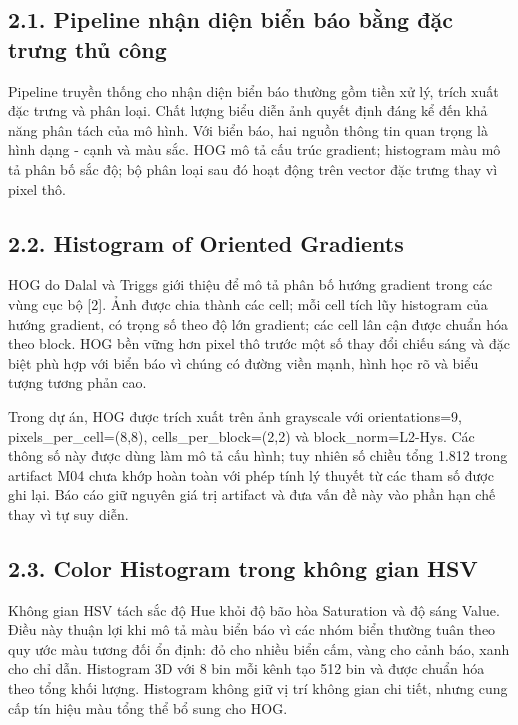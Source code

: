 \documentclass[12pt,a4paper]{article}
\begin{document}
\subsection{2.1. Pipeline nhận diện biển báo bằng đặc trưng thủ
công}\label{pipeline-nhux1eadn-diux1ec7n-biux1ec3n-buxe1o-bux1eb1ng-ux111ux1eb7c-trux1b0ng-thux1ee7-cuxf4ng}

Pipeline truyền thống cho nhận diện biển báo thường gồm tiền xử lý,
trích xuất đặc trưng và phân loại. Chất lượng biểu diễn ảnh quyết định
đáng kể đến khả năng phân tách của mô hình. Với biển báo, hai nguồn
thông tin quan trọng là hình dạng - cạnh và màu sắc. HOG mô tả cấu trúc
gradient; histogram màu mô tả phân bố sắc độ; bộ phân loại sau đó hoạt
động trên vector đặc trưng thay vì pixel thô.

\subsection{2.2. Histogram of Oriented
Gradients}\label{histogram-of-oriented-gradients}

HOG do Dalal và Triggs giới thiệu để mô tả phân bố hướng gradient trong
các vùng cục bộ {[}2{]}. Ảnh được chia thành các cell; mỗi cell tích lũy
histogram của hướng gradient, có trọng số theo độ lớn gradient; các cell
lân cận được chuẩn hóa theo block. HOG bền vững hơn pixel thô trước một
số thay đổi chiếu sáng và đặc biệt phù hợp với biển báo vì chúng có
đường viền mạnh, hình học rõ và biểu tượng tương phản cao.

Trong dự án, HOG được trích xuất trên ảnh grayscale với orientations=9,
pixels\_per\_cell=(8,8), cells\_per\_block=(2,2) và block\_norm=L2-Hys.
Các thông số này được dùng làm mô tả cấu hình; tuy nhiên số chiều tổng
1.812 trong artifact M04 chưa khớp hoàn toàn với phép tính lý thuyết từ
các tham số được ghi lại. Báo cáo giữ nguyên giá trị artifact và đưa vấn
đề này vào phần hạn chế thay vì tự suy diễn.

\subsection{2.3. Color Histogram trong không gian
HSV}\label{color-histogram-trong-khuxf4ng-gian-hsv}

Không gian HSV tách sắc độ Hue khỏi độ bão hòa Saturation và độ sáng
Value. Điều này thuận lợi khi mô tả màu biển báo vì các nhóm biển thường
tuân theo quy ước màu tương đối ổn định: đỏ cho nhiều biển cấm, vàng cho
cảnh báo, xanh cho chỉ dẫn. Histogram 3D với 8 bin mỗi kênh tạo 512 bin
và được chuẩn hóa theo tổng khối lượng. Histogram không giữ vị trí không
gian chi tiết, nhưng cung cấp tín hiệu màu tổng thể bổ sung cho HOG.
\end{document}
